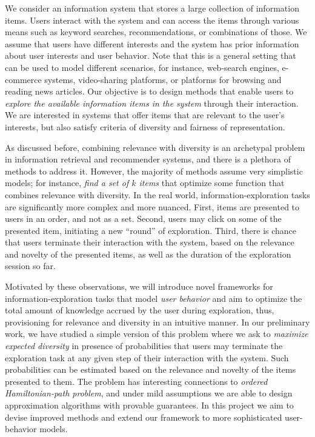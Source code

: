 \documentclass[a4paper,11pt]{article}
\begin{document}
\vspace{2mm}
\fi

We consider an information system
that stores a large collection of information items.
Users interact with the system and can access the items through various means 
such as keyword searches, recommendations, or combinations of those.
We assume that users have different interests
and the system has prior information about user interests and user behavior.
Note that this is a general setting that can be used to model different scenarios, 
for instance, web-search engines, e-commerce systems, video-sharing platforms, 
or platforms for browsing and reading news articles.
Our objective is to design methods that enable users to 
\emph{explore the available information items in the system} through their interaction.
We are interested in systems that offer items that are relevant to the user's interests, 
but also satisfy criteria of diversity and fairness of representation.

As discussed before, combining relevance with diversity is an archetypal problem
in information retrieval and recommender systems, 
and there is a plethora of methods to address it. 
However, the majority of methods assume very simplistic models;
for instance, \emph{find a set of $k$ items} 
that optimize some function that combines relevance with diversity. 
In the real world, information-exploration tasks are significantly more complex and more nuanced. 
First, items are presented to users in an order, and not as a set.
Second, users may click on some of the presented item, 
initiating a new ``round'' of exploration. 
Third, there is chance that users terminate their interaction with the system, 
based on the relevance and novelty of the presented items,
as well as the duration of the exploration session so far.

Motivated by these observations, 
we will introduce novel frameworks for information-exploration tasks
that model \emph{user behavior} and aim to optimize 
the total amount of knowledge accrued by the user during exploration, 
thus, provisioning for relevance and diversity in an intuitive manner.
In our preliminary work, we have studied a simple version 
of this problem where we ask to \emph{maximize expected diversity} 
in presence of probabilities that users may terminate the exploration task
at any given step of their interaction with the system.
Such probabilities can be estimated based on the relevance and novelty
of the items presented to them.
The problem has interesting connections to \emph{ordered Hamiltonian-path problem}, 
and under mild assumptions we are able to design approximation algorithms
with provable guarantees.
In this project we aim to devise improved methods
and extend our framework to more sophisticated user-behavior models.
\end{document}
